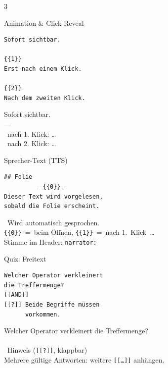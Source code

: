 \documentclass[a4paper,landscape,9pt]{extarticle}
\newcommand{\prevsm}[1]{{\footnotesize\color{muted} #1}}
\begin{document}
\begin{multicols}{3}


\begin{liacard}{Animation \& Click-Reveal}
\begin{lstlisting}[language=lia]
Sofort sichtbar.

{{1}}
Erst nach einem Klick.

{{2}}
Nach dem zweiten Klick.
\end{lstlisting}
\tcblower
\prevsm{Sofort sichtbar.\\
{\color{rulegray}---}\\
\faMousePointer~nach 1. Klick: \textit{\dots}\\
\faMousePointer~nach 2. Klick: \textit{\dots}}
\end{liacard}

\begin{liacard}{Sprecher-Text (TTS)}
\begin{lstlisting}[language=lia]
## Folie
         --{{0}}--
Dieser Text wird vorgelesen,
sobald die Folie erscheint.
\end{lstlisting}
\tcblower
\prevsm{\faVolumeUp~Wird automatisch
gesprochen.\\
\texttt{\{\{0\}\}}~=~beim Öffnen,
\texttt{\{\{1\}\}}~=~nach 1.~Klick~\dots\\[2pt]
{\footnotesize Stimme im Header: \texttt{narrator:}}}
\end{liacard}


\begin{liacard}{Quiz: Freitext}
\begin{lstlisting}[language=lia]
Welcher Operator verkleinert
die Treffermenge?
[[AND]]
[[?]] Beide Begriffe müssen
      vorkommen.
\end{lstlisting}
\tcblower
\prevsm{Welcher Operator verkleinert die Treffermenge?\\[2pt]
\fbox{\strut\hspace{6em}}\\[3pt]
\faQuestionCircle~Hinweis (\texttt{[[?]]}, klappbar)\\[2pt]
{\footnotesize Mehrere gültige Antworten: weitere \texttt{[[\dots]]} anhängen.}}
\end{liacard}


\end{multicols}
\end{document}
